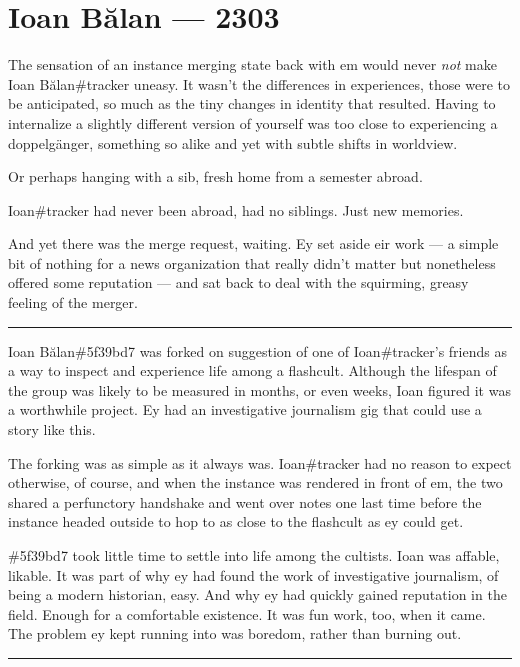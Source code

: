 \chapter*{Ioan Bălan — 2303}

The sensation of an instance merging state back with em would never \emph{not} make Ioan Bălan\#tracker uneasy. It wasn't the differences in experiences, those were to be anticipated, so much as the tiny changes in identity that resulted. Having to internalize a slightly different version of yourself was too close to experiencing a doppelgänger, something so alike and yet with subtle shifts in worldview.

Or perhaps hanging with a sib, fresh home from a semester abroad.

Ioan\#tracker had never been abroad, had no siblings. Just new memories.

And yet there was the merge request, waiting. Ey set aside eir work --- a simple bit of nothing for a news organization that really didn't matter but nonetheless offered some reputation --- and sat back to deal with the squirming, greasy feeling of the merger.

\begin{center}\rule{0.5\linewidth}{\linethickness}\end{center}

Ioan Bălan\#5f39bd7 was forked on suggestion of one of Ioan\#tracker's friends as a way to inspect and experience life among a flashcult. Although the lifespan of the group was likely to be measured in months, or even weeks, Ioan figured it was a worthwhile project. Ey had an investigative journalism gig that could use a story like this.

The forking was as simple as it always was. Ioan\#tracker had no reason to expect otherwise, of course, and when the instance was rendered in front of em, the two shared a perfunctory handshake and went over notes one last time before the instance headed outside to hop to as close to the flashcult as ey could get.

\#5f39bd7 took little time to settle into life among the cultists. Ioan was affable, likable. It was part of why ey had found the work of investigative journalism, of being a modern historian, easy. And why ey had quickly gained reputation in the field. Enough for a comfortable existence. It was fun work, too, when it came. The problem ey kept running into was boredom, rather than burning out.

\begin{center}\rule{0.5\linewidth}{\linethickness}\end{center}

